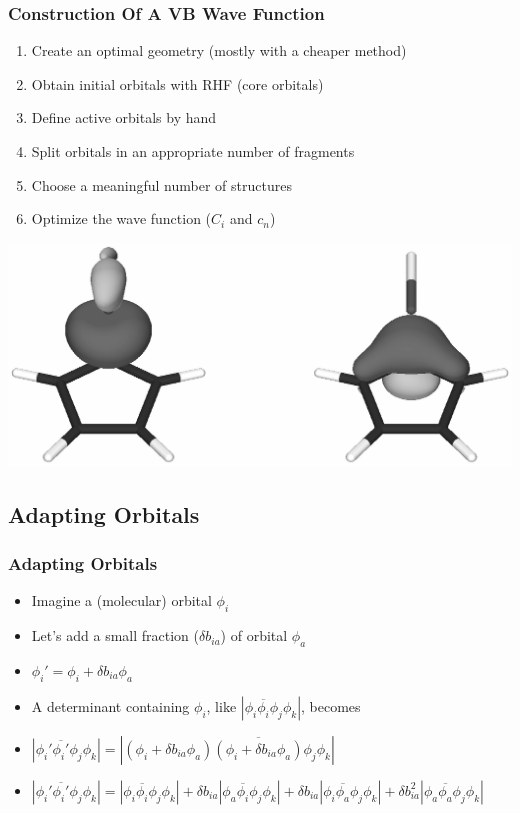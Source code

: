 \documentclass[]{beamer}
\begin{document}
\begin{frame}
  \frametitle{Construction Of A VB Wave Function}
  \begin{enumerate}
    \item {Create an optimal geometry (mostly with a cheaper method)}
    \item {Obtain initial orbitals with RHF (core orbitals)}
    \item {Define active orbitals by hand}
    \item {Split orbitals in an appropriate number of fragments}
    \item {Choose a meaningful number of structures}
    \item {Optimize the wave function ($C_i$ and $c_n$)}
  \end{enumerate}
  \begin{center}
    \includegraphics[scale=0.4]{figures/sigma_sih.eps}
  \end{center}
\end{frame}

\subsection{Adapting Orbitals}

\begin{frame}
  \frametitle{Adapting Orbitals}
  \begin{itemize}  
    \item \alert<+> {Imagine a (molecular) orbital $\phi_i$}
    \item \alert<+> {Let's add a small fraction ($\delta b_{ia}$) of orbital $\phi_a$}
    \item \alert<+> {$\phi_i' = \phi_i + \delta b_{ia} \phi_a$}
    \item \alert<+> {A determinant containing $\phi_i$, like $|\phi_i\overline{\phi_i}\phi_j\phi_k|$, becomes}
    \item \alert<+> {$|\phi_i'\overline{\phi_i'}\phi_j\phi_k | = |(\phi_i + \delta b_{ia} \phi_a)\overline{(\phi_i + \delta b_{ia} \phi_a)}\phi_j\phi_k|$}
    \item \alert<+> {$|\phi_i'\overline{\phi_i'}\phi_j\phi_k | = |\phi_i\overline{\phi_i}\phi_j\phi_k| + \delta b_{ia}|\phi_a\overline{\phi_i}\phi_j\phi_k| + \delta b_{ia} |\phi_i\overline{\phi_a}\phi_j\phi_k| + \delta b^2_{ia} |\phi_a\overline{\phi_a}\phi_j\phi_k|$}
  \end{itemize}
\end{frame}
\end{document}
